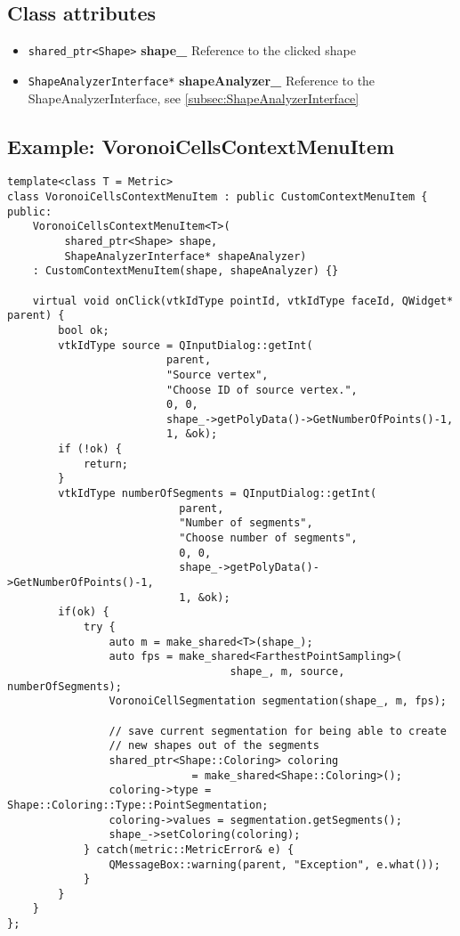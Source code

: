 \subsection{Class attributes}
\begin{itemize}
	\item \texttt{shared\_ptr<Shape>} \textbf{shape\_} Reference to the clicked shape
	\item \texttt{ShapeAnalyzerInterface*} \textbf{shapeAnalyzer\_} Reference to the ShapeAnalyzerInterface, see \ref{subsec:ShapeAnalyzerInterface}
\end{itemize}

\subsection{Example: VoronoiCellsContextMenuItem}
\label{subsec:ExampleVoronoiCellsContextMenuItem}

\begin{lstlisting}[style=lstStyleCpp, caption={VoronoiCellsContextMenuItem.h}]
template<class T = Metric>
class VoronoiCellsContextMenuItem : public CustomContextMenuItem {
public:
    VoronoiCellsContextMenuItem<T>(
         shared_ptr<Shape> shape, 
         ShapeAnalyzerInterface* shapeAnalyzer) 
    : CustomContextMenuItem(shape, shapeAnalyzer) {}
    
    virtual void onClick(vtkIdType pointId, vtkIdType faceId, QWidget* parent) {
        bool ok;
        vtkIdType source = QInputDialog::getInt(
                         parent,
                         "Source vertex",
                         "Choose ID of source vertex.",
                         0, 0,
                         shape_->getPolyData()->GetNumberOfPoints()-1,
                         1, &ok);
        if (!ok) {
            return;
        }
        vtkIdType numberOfSegments = QInputDialog::getInt(
                           parent,
                           "Number of segments",
                           "Choose number of segments",
                           0, 0,
                           shape_->getPolyData()->GetNumberOfPoints()-1,
                           1, &ok);
        if(ok) {
            try {
                auto m = make_shared<T>(shape_);
                auto fps = make_shared<FarthestPointSampling>(
                                   shape_, m, source, numberOfSegments);
                VoronoiCellSegmentation segmentation(shape_, m, fps);
                
                // save current segmentation for being able to create 
                // new shapes out of the segments
                shared_ptr<Shape::Coloring> coloring 
                             = make_shared<Shape::Coloring>();
                coloring->type = Shape::Coloring::Type::PointSegmentation;
                coloring->values = segmentation.getSegments();
                shape_->setColoring(coloring);
            } catch(metric::MetricError& e) {
                QMessageBox::warning(parent, "Exception", e.what());
            }
        }
    }
};

\end{lstlisting}

